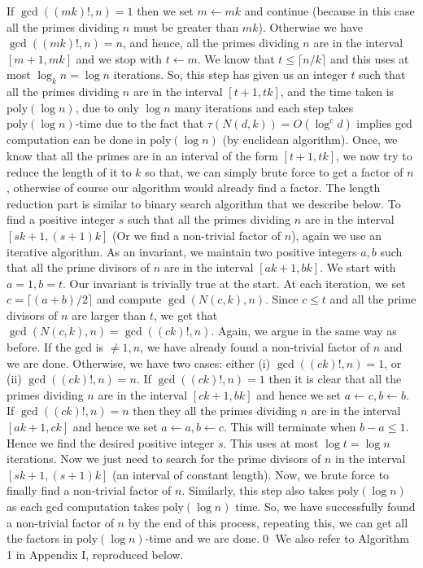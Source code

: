 If $\gcd((mk)!,n)=1$ then we set $m\leftarrow mk$ and continue (because in this case all the primes dividing $n$ must be greater than $mk$). Otherwise we have $\gcd((mk)!,n)=n$, and hence, all the primes dividing $n$ are in the interval $[m+1,mk]$ and we stop with $t\leftarrow m$. We know that $t\le\lceil n/k\rceil$ and this uses at most $\log_kn=\log n$ iterations. So, this step has given us an integer $t$ such that all the primes dividing $n$ are in the interval $[t+1,tk]$, and the time taken is $\mathrm{poly}(\log n)$, due to only $\log n$ many iterations and each step takes $\mathrm{poly}(\log n)$-time due to the fact that $\tau(N(d,k))=O(\log^cd)$ implies gcd computation can be done in $\mathrm{poly}(\log n)$ (by euclidean algorithm).
Once, we know that all the primes are in an interval of the form $[t+1,tk]$, we now try to reduce the length of it to $k$ so that, we can simply brute force to get a factor of $n$, otherwise of course our algorithm would already find a factor. The length reduction part is similar to binary search algorithm that we describe below.
To find a positive integer $s$ such that all the primes dividing $n$ are in the interval $[sk+1,(s+1)k]$ (Or we find a non-trivial factor of $n$), again we use an iterative algorithm. As an invariant, we maintain two positive integers $a,b$ such that all the prime divisors of $n$ are in the interval $[ak+1,bk]$. We start with $a=1,b=t$. Our invariant is trivially true at the start.
At each iteration, we set $c=\lceil(a+b)/2\rceil$ and compute $\gcd(N(c,k),n)$. Since $c\le t$ and all the prime divisors of $n$ are larger than $t$, we get that $\gcd(N(c,k),n)=\gcd((ck)!,n)$. Again, we argue in the same way as before. If the gcd is $\ne1,n$, we have already found a non-trivial factor of $n$ and we are done. Otherwise, we have two cases: either (i) $\gcd((ck)!,n)=1$, or (ii) $\gcd((ck)!,n)=n$.
If $\gcd((ck)!,n)=1$ then it is clear that all the primes dividing $n$ are in the interval $[ck+1,bk]$ and hence we set $a\leftarrow c,b\leftarrow b$. If $\gcd((ck)!,n)=n$ then they all the primes dividing $n$ are in the interval $[ak+1,ck]$ and hence we set $a\leftarrow a,b\leftarrow c$. This will terminate when $b-a\le1$. Hence we find the desired positive integer $s$. This uses at most $\log t=\log n$ iterations.
Now we just need to search for the prime divisors of $n$ in the interval $[sk+1,(s+1)k]$ (an interval of constant length). Now, we brute force to finally find a non-trivial factor of $n$. Similarly, this step also takes $\mathrm{poly}(\log n)$ as each gcd computation takes $\mathrm{poly}(\log n)$ time. So, we have successfully found a non-trivial factor of $n$ by the end of this process, repeating this, we can get all the factors in $\mathrm{poly}(\log n)$-time and we are done.\qed
We also refer to Algorithm 1 in Appendix I, reproduced below.
